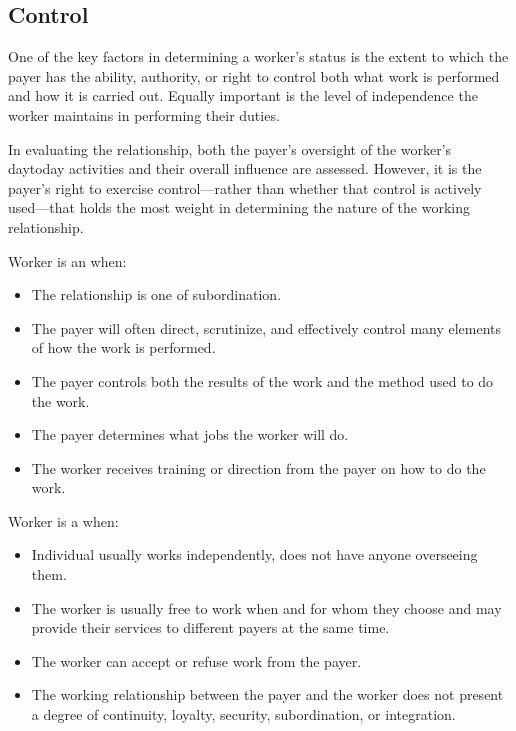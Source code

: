 \documentclass[letterpaper,10pt,english]{sphinxmanual}
\begin{document}
\subsection{Control}
\label{\detokenize{compliance:control}}
\sphinxAtStartPar
One of the key factors in determining a worker’s status is the extent to which the payer has the ability, authority, or
right to control both what work is performed and how it is carried out. Equally important is the level of independence the
worker maintains in performing their duties.

\sphinxAtStartPar
In evaluating the relationship, both the payer’s oversight of the worker’s day\sphinxhyphen{}to\sphinxhyphen{}day activities and their overall
influence are assessed. However, it is the payer’s right to exercise control—rather than whether that control is actively
used—that holds the most weight in determining the nature of the working relationship.

\sphinxAtStartPar
Worker is an  when:
\begin{itemize}
\item {} 
\sphinxAtStartPar
The relationship is one of subordination.

\item {} 
\sphinxAtStartPar
The payer will often direct, scrutinize, and effectively control many elements of how the work is performed.

\item {} 
\sphinxAtStartPar
The payer controls both the results of the work and the method used to do the work.

\item {} 
\sphinxAtStartPar
The payer determines what jobs the worker will do.

\item {} 
\sphinxAtStartPar
The worker receives training or direction from the payer on how to do the work.

\end{itemize}

\sphinxAtStartPar
Worker is a  when:
\begin{itemize}
\item {} 
\sphinxAtStartPar
Individual usually works independently, does not have anyone overseeing them.

\item {} 
\sphinxAtStartPar
The worker is usually free to work when and for whom they choose and may provide their services to different payers at the same time.

\item {} 
\sphinxAtStartPar
The worker can accept or refuse work from the payer.

\item {} 
\sphinxAtStartPar
The working relationship between the payer and the worker does not present a degree of continuity, loyalty, security, subordination, or integration.

\end{itemize}
\end{document}
